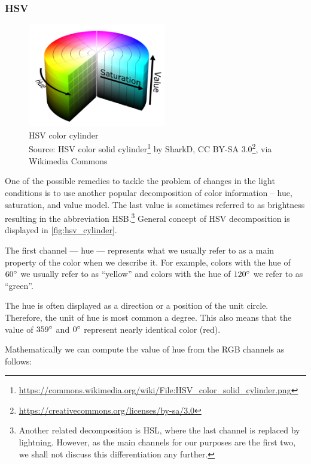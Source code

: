 \subsubsection{HSV}

\begin{figure}
    \centering
    \includegraphics[width=6cm]{img/HSV_color_solid_cylinder.png}
    \caption[HSV color cylinder]{HSV color cylinder\\Source: HSV color solid cylinder\footnote{\url{https://commons.wikimedia.org/wiki/File:HSV_color_solid_cylinder.png}} by SharkD, CC BY-SA 3.0\footnote{\url{https://creativecommons.org/licenses/by-sa/3.0}}, via Wikimedia Commons}
    \label{fig:hsv_cylinder}
\end{figure}

One of the possible remedies to tackle the problem of changes in the light conditions is to use another popular decomposition of color information -- hue, saturation, and value model. The last value is sometimes referred to as brightness resulting in the abbreviation HSB.\footnote{Another related decomposition is HSL, where the last channel is replaced by lightning. However, as the main channels for our purposes are the first two, we shall not discuss this differentiation any further.} General concept of HSV decomposition is displayed in \autoref{fig:hsv_cylinder}.

The first channel --- hue --- represents what we usually refer to as a main property of the color when we describe it. For example, colors with the hue of $60\degree$ we usually refer to as ``yellow'' and colors with the hue of $120\degree$ we refer to as ``green''.

The hue is often displayed as a direction or a position of the unit circle. Therefore, the unit of hue is most common a degree. This also means that the value of $359\degree$ and $0\degree$ represent nearly identical color (red).

Mathematically we can compute the value of hue from the RGB channels as
follows:

